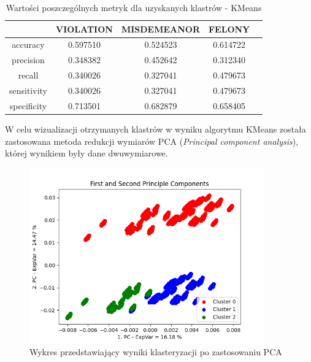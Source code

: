 \documentclass{classrep}
\begin{document}
{{{                \begin{table}[!htbp]
                \centering
                \begin{tabular}{|c|c|c|c|c|}
                    \hline
                 & VIOLATION  &  MISDEMEANOR & FELONY\\ \hline
                accuracy            &  0.597510  &   0.524523 &  0.614722  \\
                precision      &        0.348382  &   0.452642 & 0.312340 \\
                recall        &        0.340026   &  0.327041 & 0.479673   \\
                sensitivity     &       0.340026  &   0.327041 & 0.479673   \\
                specificity     &      0.713501   &  0.682879 & 0.658405  \\
                    \hline
                \end{tabular}
                \caption{Wartości poszczególnych metryk dla uzyskanych klastrów - KMeans}
                \label{tab:kmeans_metrics}
                \end{table}

                W celu wizualizacji otrzymanych klastrów w wyniku algorytmu KMeans
                została zastosowana metoda redukcji wymiarów PCA (\textit{Principal
                component analysis}), której wynikiem były dane dwuwymiarowe.
                
                
                \begin{figure}[!htbp]
                    \centering
                    \includegraphics[width=0.9\textwidth]{img/clustering/pca_plot.png}
                    \caption{Wykres przedstawiający wyniki klasteryzacji po zastosowaniu PCA}
                    \label{clust_pca}
                \end{figure}
                \FloatBarrier
                
}}}
\end{document}
